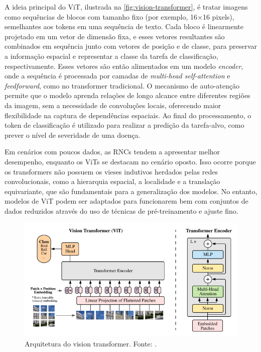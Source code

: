 A ideia principal do ViT, ilustrada na \autoref{fig:vision-transformer}, é tratar imagens como sequências de blocos com tamanho fixo (por exemplo, 16×16 pixels), semelhantes aos tokens em uma sequência de texto. Cada bloco é linearmente projetado em um vetor de dimensão fixa, e esses vetores resultantes são combinados em sequência junto com vetores de posição e de classe, para preservar a informação espacial e representar a classe da tarefa de classificação, respectivamente. Esses vetores são então alimentados em um modelo \textit{encoder}, onde a sequência é processada por camadas de \textit{multi-head self-attention} e \textit{feedforward}, como no transformer tradicional. O mecanismo de auto-atenção permite que o modelo aprenda relações de longo alcance entre diferentes regiões da imagem, sem a necessidade de convoluções locais, oferecendo maior flexibilidade na captura de dependências espaciais. Ao final do processamento, o token de classificação é utilizado para realizar a predição da tarefa-alvo, como prever o nível de severidade de uma doença.

Em cenários com poucos dados, as RNCs tendem a apresentar melhor desempenho, enquanto os ViTs se destacam no cenário oposto. Isso ocorre porque os transformers não possuem os vieses indutivos herdados pelas redes convolucionais, como a hierarquia espacial, a localidade e a translação equivariante, que são fundamentais para a generalização dos modelos. No entanto, modelos de ViT podem ser adaptados para funcionarem bem com conjuntos de dados reduzidos através do uso de técnicas de pré-treinamento e ajuste fino.

\begin{figure}[!htbp]
    \centering
    \includegraphics[width=1.0\linewidth]{figs/vision-transformer.png}
    \caption{Arquitetura do vision transformer. Fonte: .}
    \label{fig:vision-transformer}
\end{figure}

